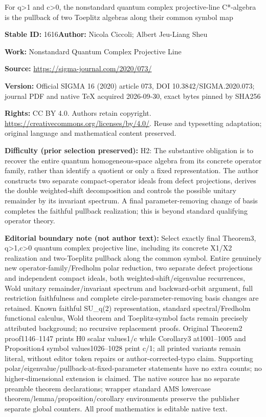 \documentclass[11pt]{article}
\numberwithin{equation}{section}
\begin{document}
\begin{center}\Large For q>1 and c>0, the nonstandard quantum complex projective-line C*-algebra is the pullback of two Toeplitz algebras along their common symbol map\end{center}
\noindent\textbf{Stable ID:} 1616\quad\textbf{Author:} Nicola Ciccoli; Albert Jeu-Liang Sheu\par
\noindent\textbf{Work:} Nonstandard Quantum Complex Projective Line\par
\noindent\textbf{Source:} \url{https://sigma-journal.com/2020/073/}\par
\noindent\textbf{Version:} Official SIGMA 16 (2020) article 073, DOI 10.3842/SIGMA.2020.073; journal PDF and native TeX acquired 2026-09-30, exact bytes pinned by SHA256\par
\noindent\textbf{Rights:} CC BY 4.0. Authors retain copyright. \url{https://creativecommons.org/licenses/by/4.0/}. Reuse and typesetting adaptation; original language and mathematical content preserved.\par
\noindent\textbf{Difficulty (prior selection preserved):} {\CJKfont H2: The substantive obligation is to recover the entire quantum homogeneous-space algebra from its concrete operator family, rather than identify a quotient or only a fixed representation. The author constructs two separate compact-operator ideals from defect projections, derives the double weighted-shift decomposition and controls the possible unitary remainder by its invariant spectrum. A final parameter-removing change of basis completes the faithful pullback realization; this is beyond standard qualifying operator theory.}\par
\medskip\noindent\textbf{Editorial boundary note (not author text):} Select exactly final Theorem3, q>1,c>0 quantum complex projective line, including its concrete X1/X2 realization and two-Toeplitz pullback along the common symbol. Entire genuinely new operator-family/Fredholm polar reduction, two separate defect projections and independent compact ideals, both weighted-shift/eigenvalue recurrences, Wold unitary remainder/invariant spectrum and backward-orbit argument, full restriction faithfulness and complete circle-parameter-removing basis changes are retained. Known faithful SU\_q(2) representation, standard spectral/Fredholm functional calculus, Wold theorem and Toeplitz-symbol facts remain precisely attributed background; no recursive replacement proofs. Original Theorem2 proof1146–1147 prints H0 scalar values1/c while Corollary3 at1001–1005 and Proposition4 symbol values1026–1028 print c/1; all printed variants remain literal, without editor token repairs or author-corrected-typo claim. Supporting polar/eigenvalue/pullback-at-fixed-parameter statements have no extra counts; no higher-dimensional extension is claimed. The native source has no separate preamble theorem declarations; wrapper standard AMS lowercase theorem/lemma/proposition/corollary environments preserve the publisher separate global counters. All proof mathematics is editable native text.\par
\end{document}
